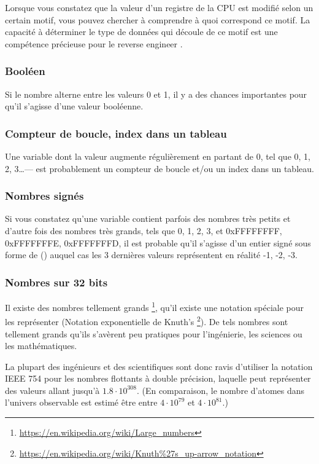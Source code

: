 Lorsque vous constatez que la valeur d'un registre de la CPU est modifié selon un certain motif, vous pouvez
chercher à comprendre à quoi correspond ce motif.
La capacité à déterminer le type de données qui découle de ce motif est une compétence précieuse pour le reverse engineer .

\subsubsection{Booléen}

Si le nombre alterne entre les valeurs 0 et 1, il y a des chances importantes pour qu'il s'agisse d'une valeur booléenne.

\subsubsection{Compteur de boucle, index dans un tableau}

Une variable dont la valeur augmente régulièrement en partant de 0, tel que 0, 1, 2, 3\dots--- est probablement un
compteur de boucle et/ou un index dans un tableau.

\subsubsection{Nombres signés}

Si vous constatez qu'une variable contient parfois des nombres très petits et d'autre fois des nombres très grands,
tels que 0, 1, 2, 3, et 0xFFFFFFFF, 0xFFFFFFFE, 0xFFFFFFFD, il est probable qu'il s'agisse d'un entier signé sous
forme de  () auquel cas les 3 dernières valeurs représentent en réalité
-1, -2, -3.

\subsubsection{Nombres sur 32 bits}

Il existe des nombres tellement grands \footnote{\url{https://en.wikipedia.org/wiki/Large_numbers}},
qu'il existe une notation spéciale pour les représenter (Notation exponentielle de Knuth's
\footnote{\url{https://en.wikipedia.org/wiki/Knuth\%27s_up-arrow_notation}}).
De tels nombres sont tellement grands qu'ils s'avèrent peu pratiques pour l'ingénierie, les sciences
ou les mathématiques.

La plupart des ingénieurs et des scientifiques sont donc ravis d'utiliser la notation IEEE 754 pour les
nombres flottants à double précision, laquelle peut représenter des valeurs allant jusqu'à $1.8 \cdot 10^{308}$.
(En comparaison, le nombre d'atomes dans l'univers observable est estimé être entre $4 \cdot 10^{79}$ et $4 \cdot 10^{81}$.)

